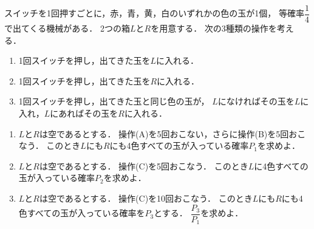\documentclass[../../main.tex]{subfiles}
\begin{document}

スイッチを1回押すごとに，赤，青，黄，白のいずれかの色の玉が1個，
等確率$\displaystyle\dfrac{1}{4}$で出てくる機械がある．
2つの箱$L$と$R$を用意する．
次の3種類の操作を考える．
\begin{enumerate}
  \item[(A)] 1回スイッチを押し，出てきた玉を$L$に入れる．
  \item[(B)] 1回スイッチを押し，出てきた玉を$R$に入れる．
  \item[(C)] 1回スイッチを押し，出てきた玉と同じ色の玉が，
    $L$になければその玉を$L$に入れ，$L$にあればその玉を$R$に入れる．
\end{enumerate}

\begin{enumerate}
  \item $L$と$R$は空であるとする．
    操作(A)を5回おこない，さらに操作(B)を5回おこなう．
    このとき$L$にも$R$にも4色すべての玉が入っている確率$P_1$を求めよ．
  \item $L$と$R$は空であるとする．
    操作(C)を5回おこなう．
    このとき$L$に4色すべての玉が入っている確率$P_2$を求めよ．
  \item $L$と$R$は空であるとする．
    操作(C)を10回おこなう．
    このとき$L$にも$R$にも4色すべての玉が入っている確率を$P_3$とする．
    $\displaystyle\dfrac{P_3}{P_1}$を求めよ．
\end{enumerate}
\end{document}
